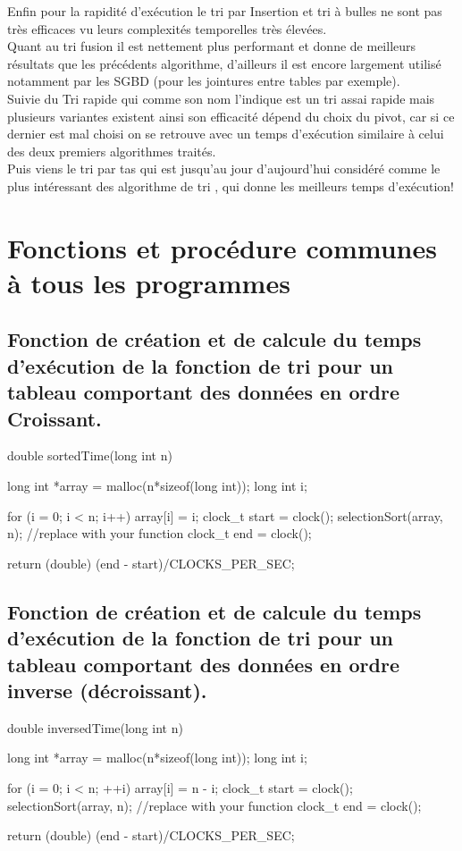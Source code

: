 \documentclass[12pt]{article}
\begin{document}
Enfin pour la rapidité d'exécution le tri par Insertion et tri à bulles ne sont pas très efficaces vu leurs complexités temporelles très élevées.\\
Quant au tri fusion il est nettement plus performant et donne de meilleurs résultats que les précédents algorithme, d'ailleurs il est encore largement utilisé notamment par les SGBD (pour les jointures entre tables par exemple).\\
Suivie du Tri rapide qui comme son nom l'indique est un tri assai rapide mais plusieurs variantes existent ainsi son efficacité dépend du choix du pivot, car si ce dernier est mal choisi on se retrouve avec un temps d'exécution similaire à celui des deux premiers algorithmes traités.\\

Puis viens le tri par tas qui est jusqu'au jour d'aujourd'hui considéré comme le plus intéressant des algorithme de tri , qui donne les meilleurs temps d'exécution!

\newpage

\section{Fonctions et procédure communes à tous les programmes}

\subsection{Fonction de création et de calcule du temps d'exécution de la fonction de tri pour un tableau comportant des données en ordre Croissant.}
\begin{sql}
double sortedTime(long int n) {
    
  long int *array = malloc(n*sizeof(long int));
  long int i;
  
  for (i = 0; i < n; i++)
  {
      array[i] = i;
  }
  clock_t start = clock();
  selectionSort(array, n); //replace with your function 
  clock_t end = clock();
  
  return (double) (end - start)/CLOCKS_PER_SEC;
}

\end{sql}

\subsection{Fonction de création et de calcule du temps d'exécution de la fonction de tri pour un tableau comportant des données en ordre inverse (décroissant). }
\begin{sql}
double inversedTime(long int n) {
    
  long int *array = malloc(n*sizeof(long int));
  long int i;
  
  for (i = 0; i < n; ++i)
  {
    array[i] = n - i;
  }
  clock_t start = clock();
  selectionSort(array, n); //replace with your function 
  clock_t end = clock();

  return (double) (end - start)/CLOCKS_PER_SEC;
}
\end{sql}
\end{document}
